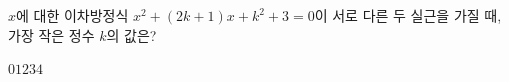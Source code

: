 $x$에 대한 이차방정식 $x^2+(2k+1)x+k^2+3=0$이 서로 다른 두 실근을 가질 때, 가장 작은 정수 $k$의 값은?
\begin{choices32}{$0$}{$1$}{$2$}{$3$}{$4$}\end{choices32}
